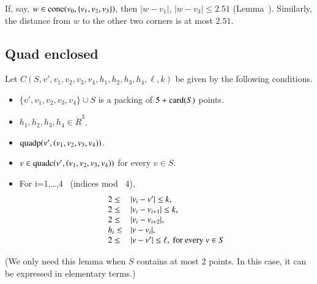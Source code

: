 \begin{tarskidata}
\begin{tarski}
\begin{proved}
If, say, $w\in {\operatorname{cone}}(v_0,\{v_1,v_2,v_3\})$, then
$|w-v_1|$, $|w-v_3|\le 2.51$ (Lemma~).
 Similarly, the distance from
$w$ to the other two corners is at most $2.51$.
\swallowed\end{proved}
\end{tarski}







\begin{tarski}
\section{Quad enclosed}

\begin{definition}
Let $C(S,v',v_1,v_2,v_3,v_4,h_1,h_2,h_3,h_4,\ell,k)$ be given by the following conditions.
\begin{itemize}
 \item $\{v',v_1,v_2,v_3,v_4\}\cup S$ is a packing of $5+{\operatorname{card}}(S)$ points.
 \item $h_1,h_2,h_3,h_4\in\ring{R}^3$. 
 \item ${\operatorname{quadp}}(v',(v_1,v_2,v_3,v_4))$.
  \item $v\in {\operatorname{quadc}}(v',(v_1,v_2,v_3,v_4))$ for every $v\in S$.
  \item For i=1,\ldots,4 \ (indices \hbox{mod } 4),
   $$\begin{array}{lll}
    2\le &|v_i-v'|\le k,\\
    2\le&|v_i-v_{i+1}|\le k, \\
    2\le&|v_i-v_{i+2}|,\\
    h_i\le &|v-v_i|, \\
    2\le &|v-v'|\le \ell, \hbox{ for every } v\in S 
    \end{array}
    $$
\end{itemize}
(We only need this lemma when $S$ contains at most $2$ points.  In this case, it can be expressed
in elementary terms.)
\end{definition}


\end{tarski}
\end{tarskidata}
